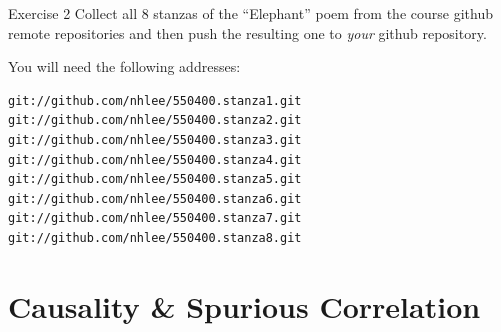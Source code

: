 \documentclass[hyperref={colorlinks=false},handout,10pt]{beamer}
\begin{document}
\begin{frame}
    \begin{block}{Exercise 2}
        Collect all 8 stanzas of the ``Elephant'' poem from the course 
        github remote repositories and then push the resulting 
        one to \emph{your} github repository.
    \end{block}
    You will need the following addresses:
    \begin{lstlisting}
git://github.com/nhlee/550400.stanza1.git 
git://github.com/nhlee/550400.stanza2.git 
git://github.com/nhlee/550400.stanza3.git 
git://github.com/nhlee/550400.stanza4.git 
git://github.com/nhlee/550400.stanza5.git 
git://github.com/nhlee/550400.stanza6.git 
git://github.com/nhlee/550400.stanza7.git 
git://github.com/nhlee/550400.stanza8.git 
    \end{lstlisting}
\end{frame}


%

\section{Causality \& Spurious Correlation}
\end{document}
